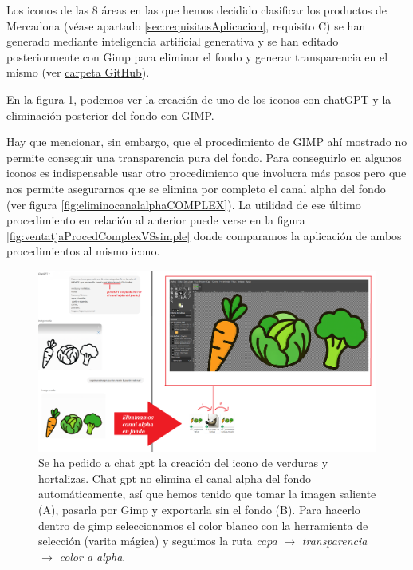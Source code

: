 \documentclass[a4paper,12pt]{report}
\begin{document}
	Los iconos de las 8 áreas en las que hemos decidido clasificar los productos de Mercadona (véase apartado \ref{sec:requisitosAplicacion}, requisito C) se han generado mediante inteligencia artificial generativa y se han editado posteriormente con Gimp para eliminar el fondo y generar transparencia en el mismo (ver \href{https://github.com/blackcub3s/mercApp/tree/main/creacioIconos/categoriesProductes}{carpeta GitHub}).
	
	
	En la figura \ref{fig:eliminocanalalpha}, podemos ver la creación de uno de los iconos con chatGPT y la eliminación posterior del fondo con GIMP. 
	
	Hay que mencionar, sin embargo, que el procedimiento de GIMP ahí mostrado no permite conseguir una transparencia pura del fondo. Para conseguirlo en algunos iconos es indispensable usar otro procedimiento que involucra más pasos pero que nos permite asegurarnos que se elimina por completo el canal alpha del fondo (ver figura \ref{fig:eliminocanalalphaCOMPLEX}). La utilidad de ese último procedimiento en relación al anterior puede verse en la figura \ref{fig:ventatjaProcedComplexVSsimple} donde comparamos la aplicación de ambos procedimientos al mismo icono.


	
	
	
	
\FloatBarrier
\setlength{\belowcaptionskip}{3pt}
\begin{figure}[H]
	\centering
	\caption{Se ha pedido a chat gpt la creación del icono de verduras y hortalizas. Chat gpt no elimina el canal alpha del fondo automáticamente, así que hemos tenido que tomar la imagen saliente (A), pasarla por Gimp y exportarla  sin el fondo (B). Para hacerlo dentro de gimp seleccionamos el color blanco con la herramienta de selección (varita mágica) y seguimos la ruta \textit{capa} $\rightarrow$ \textit{transparencia} $\rightarrow$ \textit{color a alpha}.}
	\includegraphics[width=1\linewidth]{img/eliminoCanalAlpha}


	\label{fig:eliminocanalalpha}
\end{figure}
\FloatBarrier
\end{document}

